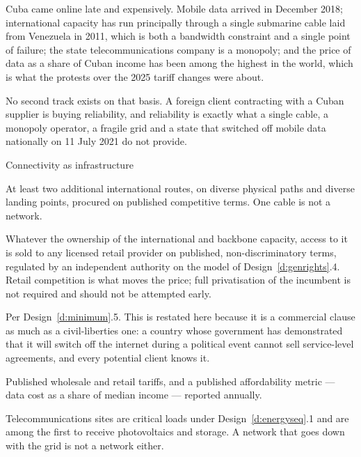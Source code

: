Cuba came online late and expensively. Mobile data arrived in December 2018;
international capacity has run principally through a single submarine cable laid
from Venezuela in 2011, which is both a bandwidth constraint and a single point
of failure; the state telecommunications company is a monopoly; and the price of
data as a share of Cuban income has been among the highest in the world, which is
what the protests over the 2025 tariff changes were about.

No second track exists on that basis. A foreign client contracting with a Cuban
supplier is buying reliability, and reliability is exactly what a single cable, a
monopoly operator, a fragile grid and a state that switched off mobile data
nationally on 11 July 2021 do not provide.

\begin{design}{Connectivity as infrastructure}
\label{d:connect}
\begin{rules}
 At least two additional international routes, on diverse
physical paths and diverse landing points, procured on published competitive
terms. One cable is not a network.

 Whatever the ownership of the international and
backbone capacity, access to it is sold to any licensed retail provider on
published, non-discriminatory terms, regulated by an independent authority on
the model of Design~\ref{d:genrights}.4. Retail competition is what moves the
price; full privatisation of the incumbent is not required and should not be
attempted early.

 Per Design~\ref{d:minimum}.5. This is
restated here because it is a commercial clause as much as a civil-liberties
one: a country whose government has demonstrated that it will switch off the
internet during a political event cannot sell service-level agreements, and
every potential client knows it.

 Published wholesale and retail tariffs, and a
published affordability metric --- data cost as a share of median income ---
reported annually.

 Telecommunications sites are critical loads under
Design~\ref{d:energyseq}.1 and are among the first to receive photovoltaics and
storage. A network that goes down with the grid is not a network either.
\end{rules}
\end{design}

